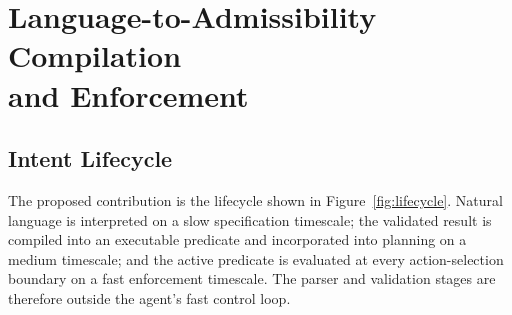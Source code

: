 \documentclass[journal]{IEEEtran}
\theoremstyle{definition}
\begin{document}

\section[Language-to-Admissibility Compilation and Enforcement]
{Language-to-Admissibility Compilation\\and Enforcement}
\label{sec:llm}

\subsection{Intent Lifecycle}
\label{subsec:lifecycle}

The proposed contribution is the lifecycle shown in
Figure~\ref{fig:lifecycle}. Natural language is interpreted on a slow
specification timescale; the validated result is compiled into an executable
predicate and incorporated into planning on a medium timescale; and the active
predicate is evaluated at every action-selection boundary on a fast enforcement
timescale. The parser and validation stages are therefore outside the agent's
fast control loop.

\end{document}

